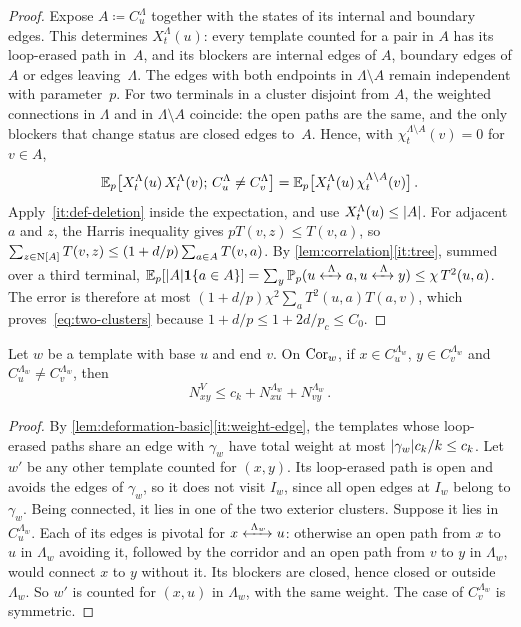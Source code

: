 \begin{proof}
Expose $A\coloneqq C^\Lambda_u$ together with the states of its internal and boundary edges. This
determines $X^\Lambda_t(u)$: every template counted for a pair in $A$ has its loop-erased path in~$A$,
and its blockers are internal edges of $A$, boundary edges of $A$ or edges leaving~$\Lambda$. The edges
with both endpoints in $\Lambda\setminus A$ remain independent with parameter~$p$. For two terminals in a
cluster disjoint from $A$, the weighted connections in $\Lambda$ and in $\Lambda\setminus A$ coincide:
the open paths are the same, and the only blockers that change status are closed edges to~$A$. Hence,
with $\chi^{\Lambda\setminus A}_t(v)=0$ for $v\in A$,
\begin{equation*}
  \mathbb E_p\bigl[X^\Lambda_t(u)\,X^\Lambda_t(v);\,C^\Lambda_u\neq C^\Lambda_v\bigr]
  =\mathbb E_p\bigl[X^\Lambda_t(u)\,\chi^{\Lambda\setminus A}_t(v)\bigr]\,.
\end{equation*}
Apply~\ref{it:def-deletion} inside the expectation, and use $X^\Lambda_t(u)\le\lvert A\rvert$. For adjacent $a$
and $z$, the Harris inequality gives $pT(v,z)\le T(v,a)$, so
$\sum_{z\in\mathrm{N}[A]}T(v,z)\le(1+d/p)\sum_{a\in A}T(v,a)$. By \cref{lem:correlation}\ref{it:tree}, summed
over a third terminal,
$\mathbb E_p[\lvert A\rvert\mathbf{1}\{a\in A\}]=\sum_y\mathbb P_p(u\xleftrightarrow{\;\Lambda\;}a,u\xleftrightarrow{\;\Lambda\;}y)\le\chi\,T^2(u,a)$. The
error is therefore at most $(1+d/p)\chi^2\sum_aT^2(u,a)T(a,v)$, which proves~\eqref{eq:two-clusters}
because $1+d/p\le1+2d/p_c\le C_0$.
\end{proof}

\begin{lemma}\label{lem:two-legs}
Let $w$ be a template with base $u$ and end $v$. On $\mathrm{Cor}_w$, if $x\in C_u^{\Lambda_w}$,
$y\in C_v^{\Lambda_w}$ and $C_u^{\Lambda_w}\neq C_v^{\Lambda_w}$, then
\begin{equation*}
  N^V_{xy}\le c_k+N^{\Lambda_w}_{xu}+N^{\Lambda_w}_{vy}\,.
\end{equation*}
\end{lemma}

\begin{proof}
By \cref{lem:deformation-basic}\ref{it:weight-edge}, the templates whose loop-erased paths share an edge
with $\gamma_w$ have total weight at most $\lvert\gamma_w\rvert c_k/k\le c_k$. Let $w'$ be any other template
counted for $(x,y)$. Its loop-erased path is open and avoids the edges of $\gamma_w$, so it does not
visit $I_w$, since all open edges at $I_w$ belong to $\gamma_w$. Being connected, it lies in one of the
two exterior clusters. Suppose it lies in $C_u^{\Lambda_w}$. Each of its edges is pivotal for
$x\xleftrightarrow{\;\Lambda_w\;}u$: otherwise an open path from $x$ to $u$ in $\Lambda_w$ avoiding it, followed by
the corridor and an open path from $v$ to $y$ in $\Lambda_w$, would connect $x$ to $y$ without it. Its
blockers are closed, hence closed or outside $\Lambda_w$. So $w'$ is counted for $(x,u)$ in
$\Lambda_w$, with the same weight. The case of $C_v^{\Lambda_w}$ is symmetric.
\end{proof}

